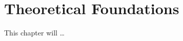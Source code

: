 
\chapter{Theoretical Foundations} %
\label{cha:theoretical_foundations}

This chapter will \ldots








